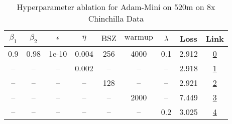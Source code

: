 \begin{table}[H]
\centering
\caption{Hyperparameter ablation for Adam-Mini on 520m on 8x Chinchilla Data}
\label{tab:ablation_adam-mini_520m_8}
\begin{tabular}{ccccccccc}
\toprule
$\beta_1$ & $\beta_2$ & $\epsilon$ & $\eta$ & $\mathrm{BSZ}$ & $\mathrm{warmup}$ & $\lambda$ & Loss & Link \\
\midrule
0.9 & 0.98 & 1e-10 & 0.004 & 256 & 4000 & 0.1 & 2.912 & \href{https://wandb.ai/stanford-mercury/optimizer-scaling/runs/sweep-520m-85B-minidfe5aclr0.004-wd0.1-minlr0-warmup4000-b10.9-b-a76572}{0} \\
\midrule
-- & -- & -- & 0.002 & -- & -- & -- & 2.918 & \href{https://wandb.ai/stanford-mercury/optimizer-scaling/runs/sweep-520m-85B-mini6bf656lr0.002-wd0.1-minlr0-warmup4000-b10.9-b-aa645d}{1} \\
-- & -- & -- & -- & 128 & -- & -- & 2.921 & \href{https://wandb.ai/stanford-mercury/optimizer-scaling/runs/sweep-520m-85B-mini6698b4lr0.004-wd0.1-minlr0-warmup4000-b10.9-b-0f2989}{2} \\
-- & -- & -- & -- & -- & 2000 & -- & 7.449 & \href{https://wandb.ai/stanford-mercury/optimizer-scaling/runs/sweep-520m-85B-minib765f6lr0.004-wd0.1-minlr0-warmup2000-b10.9-b-e401ae}{3} \\
-- & -- & -- & -- & -- & -- & 0.2 & 3.025 & \href{https://wandb.ai/stanford-mercury/optimizer-scaling/runs/sweep-520m-85B-miniba6697lr0.004-wd0.2-minlr0-warmup4000-b10.9-b-137303}{4} \\
\bottomrule
\end{tabular}
\end{table}

